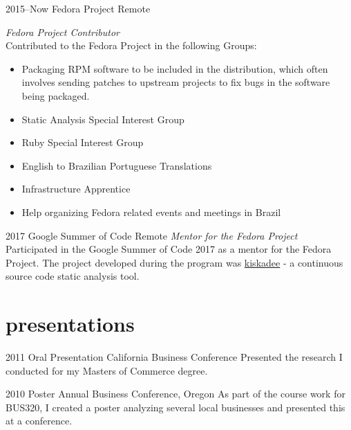 \documentclass[]{friggeri-cv} %
\begin{document}
\begin{entrylist}

\entry
{2015--Now}
{Fedora Project}
{Remote}
{\emph{Fedora Project Contributor} \\
Contributed to the Fedora Project in the following Groups:
  \begin{itemize}
    \item Packaging RPM software to be included in the distribution, which often involves sending patches to upstream projects to fix bugs in the software being packaged.
    \item Static Analysis Special Interest Group
    \item Ruby Special Interest Group
    \item English to Brazilian Portuguese Translations
    \item Infrastructure Apprentice
    \item Help organizing Fedora related events and meetings in Brazil
  \end{itemize}}


\entry
{2017}
{Google Summer of Code}
{Remote}
{\emph{Mentor for the Fedora Project} \\
  Participated in the Google Summer of Code 2017 as a mentor for the Fedora Project. The project developed during the program was \href{pagure.io/kiskadee}{kiskadee} - a continuous source code static analysis tool.}


\end{entrylist}


\section{presentations}

\begin{entrylist}


\entry
{2011}
{Oral Presentation}
{California Business Conference}
{Presented the research I conducted for my Masters of Commerce degree.}


\entry
{2010}
{Poster}
{Annual Business Conference, Oregon}
{As part of the course work for BUS320, I created a poster analyzing several local businesses and presented this at a conference.}


\end{entrylist}
\end{document}
